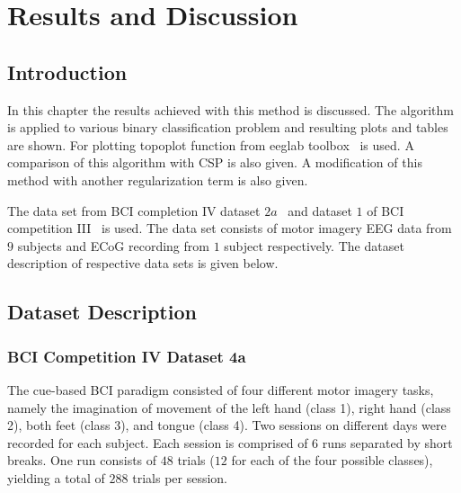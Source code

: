 
\chapter{Results and Discussion}
\section{Introduction}

In this chapter the results achieved with this method is discussed. The algorithm is applied to  various binary classification problem and resulting plots and tables are shown. For plotting topoplot function from eeglab toolbox~\cite{30} is used. A comparison of this algorithm with CSP is also given. A modification of this method with another regularization term is also given.

The data set from BCI completion IV dataset $2a$~\cite{31} and dataset $1$ of BCI competition III~\cite{32} is used. The data set consists of motor imagery EEG data from $9$ subjects and ECoG recording from $1$ subject respectively. The dataset description of respective data sets is given below.
  
\section{Dataset Description}
\subsection{BCI Competition IV Dataset 4a}

The cue-based BCI paradigm consisted of four different motor imagery tasks, namely the imagination of movement of the left hand (class 1), right hand (class 2), both feet (class 3), and tongue (class 4). Two sessions on different days were recorded for each subject. Each session is comprised of $6$ runs separated by short breaks. One run consists of $48$ trials ($12$ for each of the four possible classes), yielding a total of $288$ trials per session.

